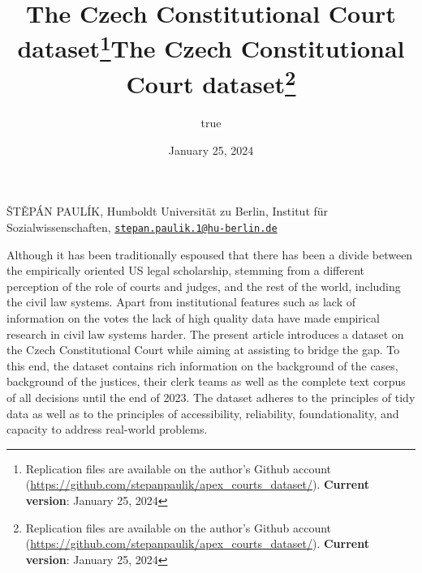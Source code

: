 \documentclass[
  11pt,
]{article}
\title{The Czech Constitutional Court dataset\thanks{Replication files
are available on the author's Github account
(\url{https://github.com/stepanpaulik/apex_courts_dataset/}).
\textbf{Current version}: January 25, 2024}}
\author{true}
\date{January 25, 2024}
\title{The Czech Constitutional Court dataset\thanks{Replication files
are available on the author's Github account
(\url{https://github.com/stepanpaulik/apex_courts_dataset/}).
\textbf{Current version}: January 25, 2024}  }
\date{}
\renewenvironment{abstract}
 {{%
    \setlength{\leftmargin}{0mm}
    \setlength{\rightmargin}{\leftmargin}%
  }%
  \relax}
 {\endlist}
\begin{document}



{%
\setlength{\parindent}{0pt}
\thispagestyle{plain}
{%
\maketitle  %

}




{
   \vskip 13.5pt\relax \normalsize\fontsize{11}{12}
   \MakeUppercase{Štěpán Paulík}, \small{Humboldt Universität zu Berlin,
Institut für Sozialwissenschaften,
\href{mailto:stepan.paulik.1@hu-berlin.de}{\nolinkurl{stepan.paulik.1@hu-berlin.de}}}   

}

}








\begin{abstract}


    \vskip 8.5pt %

\noindent \small{Although it has been traditionally espoused that there
has been a divide between the empirically oriented US legal scholarship,
stemming from a different perception of the role of courts and judges,
and the rest of the world, including the civil law systems. Apart from
institutional features such as lack of information on the votes the lack
of high quality data have made empirical research in civil law systems
harder. The present article introduces a dataset on the Czech
Constitutional Court while aiming at assisting to bridge the gap. To
this end, the dataset contains rich information on the background of the
cases, background of the justices, their clerk teams as well as the
complete text corpus of all decisions until the end of 2023. The dataset
adheres to the principles of tidy data as well as to the principles of
accessibility, reliability, foundationality, and capacity to address
real-world problems.}




\end{abstract}
\end{document}
